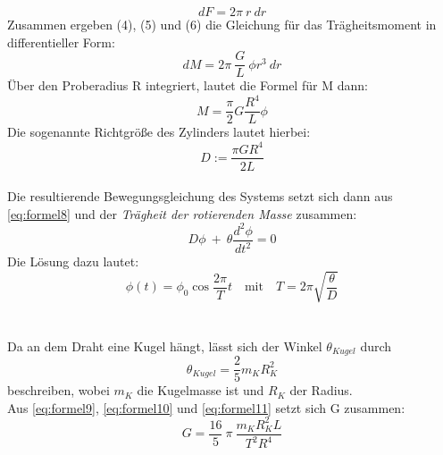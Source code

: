 \begin{equation}
    dF = 2\pi \ r \ dr
    \label{eq:formel6}
\end{equation}
Zusammen ergeben (4), (5) und (6) die Gleichung für das Trägheitsmoment in differentieller Form:
\begin{equation}
    dM = 2\pi \ \frac{G}{L} \ \phi r^3 \ dr
    \label{eq:formel7}
\end{equation}
Über den Proberadius R integriert, lautet die Formel für M dann:
\begin{equation}
    M = \frac{\pi}{2}G\frac{R^4}{L}\phi
    \label{eq:formel8}
\end{equation}
Die sogenannte Richtgröße des Zylinders lautet hierbei:
\begin{equation}
    D := \frac{\pi G R^4}{2L}
    \label{eq:formel9}
\end{equation}
\\
Die resultierende Bewegungsgleichung des Systems setzt sich dann aus \autoref{eq:formel8} und der \textit{Trägheit der rotierenden Masse} zusammen:
\begin{equation}
    D\phi \ +\ \theta\frac{d^2\phi}{dt^2} = 0
\end{equation}
Die Lösung dazu lautet:
\begin{equation}
    \phi(t) = \phi_0\cos\frac{2\pi}{T}t \quad\textrm{mit}\quad T = 2\pi\sqrt{\frac{\theta}{D}}
    \label{eq:formel10}
\end{equation}
\\
\
\\
Da an dem Draht eine Kugel hängt, lässt sich der Winkel $\theta_{Kugel}$ durch
\begin{equation}
    \theta_{Kugel} = \frac{2}{5}m_KR_K^2
    \label{eq:formel11}
\end{equation}
beschreiben, wobei $m_K$ die Kugelmasse ist und $R_K$ der Radius.\\
Aus \autoref{eq:formel9}, \autoref{eq:formel10} und \autoref{eq:formel11} setzt sich G zusammen:
\begin{equation}
    G = \frac{16}{5}\ \pi\ \frac{m_KR_K^2L}{T^2R^4}
    \label{eq:formelG}
\end{equation}